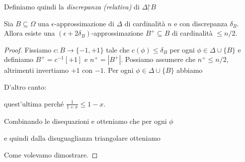 
Definiamo quindi la \emph{discrepanza (relativa)\/} di $\Delta\mathord\restriction B$




\begin{lemma}\label{aprossimazionediapprossimazione}
Sia $B\subseteq\Omega$ una $\epsilon$-approssimazione di $\Delta$ di cardinalit\`a $n$ e con discrepanza $\delta_B$. Allora esiste una $(\epsilon+2\delta_B)$-approssimazione $B^+\subseteq B$ di cardinalit\`a $\le n/2$.
\end{lemma}

\begin{proof}
Fissiamo $c:B\to\{-1,+1\}$ tale che $c(\phi)\le\delta_B$ per ogni $\phi\in\Delta\cup\{B\}$ e definiamo $B^+=c^{-1}[+1]$ e $n^+=|B^+|$. Possiamo assumere che $n^+\le n/2$, altrimenti invertiamo $+1$ con $-1
$. Per ogni $\phi\in\Delta\cup\{B\}$ abbiamo




D'altro canto:






\hfill quest'ultima perch\'e $\displaystyle\frac{1}{1+x}\le1-x$.

Combinando le disequazioni  e  otteniamo che per ogni $\phi$


e quindi dalla disuguaglianza triangolare otteniamo


Come volevamo dimostrare.
\end{proof}


